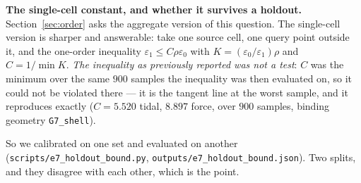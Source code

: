\noindent\textbf{The single-cell constant, and whether it survives a holdout.} Section~\ref{sec:order}
asks the aggregate version of this question. The single-cell version is sharper and answerable: take
one source cell, one query point outside it, and the one-order inequality
$\varepsilon_1\le C\rho\varepsilon_0$ with $K=(\varepsilon_0/\varepsilon_1)\rho$ and $C=1/\min K$.
\emph{The inequality as previously reported was not a test}: $C$ was the minimum over the same $900$
samples the inequality was then evaluated on, so it could not be violated there --- it is the tangent
line at the worst sample, and it reproduces exactly ($C=5.520$ tidal, $8.897$ force, over $900$
samples, binding geometry \texttt{G7\_shell}).

So we calibrated on one set and evaluated on another
(\texttt{scripts/\allowbreak e7\_holdout\_bound.\allowbreak py}, \texttt{outputs/\allowbreak e7\_holdout\_bound.\allowbreak json}). Two splits, and
they disagree with each other, which is the point.

\begin{table}[h]
\centering
\small
\caption{Holdout test of the one-order constant. Fold A leaves each cell geometry out in turn:
$C$ is calibrated on the other nine geometries and the inequality is then evaluated on the held-out
one. Fold B calibrates on two random seeds of the three stochastic families and evaluates on a third,
unseen seed. ``inflation'' is the factor by which $C$ must be raised to cover the held-out data, so
$<1$ means the calibration was already conservative there.}\label{tab:e7holdout}
\end{table}

